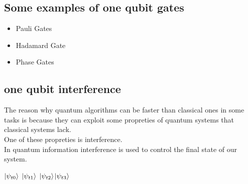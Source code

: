 \documentclass{article}
\begin{document}
\subsection{Some examples of one qubit gates}

\begin{itemize}

\item
  Pauli Gates

\item
  Hadamard Gate
  
\item
  Phase Gates
  
\end{itemize}

\subsection{one qubit interference}




The reason why quantum algorithms can be faster than classical ones
in some tasks is because they can exploit some propreties of quantum
systems that classical systems lack.\\
One of these propreties is interference.\\
In quantum information interference is used to control the final
state of our system.\\


\vspace{20pt}


\hspace{88pt}$\ket{\psi_{t0}}$ \hspace{22pt}$\ket{\psi_{t1}}$
\hspace{22pt}$\ket{\psi_{t2}}$\hspace{25pt}$\ket{\psi_{t3}}$

\vspace{30pt}
\end{document}
